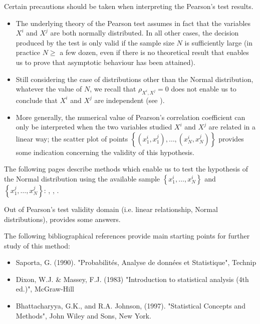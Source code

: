 {
  Certain precautions should be taken when interpreting the Pearson's test results.
  \begin{itemize}
  \item The underlying theory of the Pearson test assumes in fact that the variables $X^i$ and $X^j$ are both normally distributed. In all other cases, the decision produced by the test is only valid if the sample size $N$ is sufficiently large (in practice $N \geq$ a few dozen, even if there is no theoretical result that enables us to prove that asymptotic behaviour has been attained).
  \item Still considering the case of distributions other than the Normal distribution, whatever the value of $N$, we recall that  $\rho_{X^i,X^j}= 0$ does not enable us to conclude that $X^i$ and $X^j$ are independent (see ).
  \item More generally, the numerical value of Pearson's correlation coefficient can only be interpreted when the two variables studied $X^i$ and $X^j$ are related in a linear way; the scatter plot of points $\left\{ (x^i_1,x^j_1),\ldots,(x^i_N,x^j_N) \right\}$  provides some indication concerning the validity of this hypothesis.
  \end{itemize}

  The following pages describe methods which enable us to test the hypothesis of the Normal distribution using the available sample $\left\{ x^i_1,\ldots,x^i_N \right\}$ and $\left\{ x^j_1,\ldots,x^j_N \right\}$: ,
  , .

  Out of Pearson's test validity domain (i.e. linear relationship, Normal distributions),  provides some answers.

  The following bibliographical references provide main starting points for further study of this method:
  \begin{itemize}
  \item Saporta, G. (1990). "Probabilités, Analyse de données et Statistique", Technip
  \item Dixon, W.J. \& Massey, F.J. (1983) "Introduction to statistical analysis (4th ed.)", McGraw-Hill
  \item Bhattacharyya, G.K., and R.A. Johnson, (1997). "Statistical Concepts and Methods", John Wiley and Sons, New York.
  \end{itemize}
}
